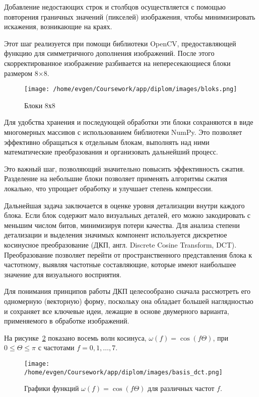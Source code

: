 Добавление недостающих строк и столбцов осуществляется с помощью повторения граничных значений (пикселей) изображения, 
чтобы минимизировать искажения, возникающие на краях. 

\AddedBlocks

Этот шаг реализуется при помощи библиотеки OpenCV, предоставляющей функцию для симметричного дополнения изображений. 
После этого скорректированное изображение разбивается на непересекающиеся блоки размером 8×8.

\begin{figure}[H]
    \centering
    \texttt{[image: /home/evgen/Coursework/app/diplom/images/bloks.png]}
    \caption{Блоки 8х8}
    \label{fig:blocks}
\end{figure}


Для удобства хранения и последующей обработки эти блоки сохраняются в виде многомерных массивов с использованием библиотеки NumPy. 
Это позволяет эффективно обращаться к отдельным блокам, выполнять над ними математические преобразования и организовать дальнейший процесс.


Это важный шаг, позволяющий значительно повысить эффективность сжатия. 
Разделение на небольшие блоки позволяет применять алгоритмы сжатия локально, что упрощает обработку и улучшает степень компрессии.

Дальнейшая задача заключается в оценке уровня детализации внутри каждого блока. 
Если блок содержит мало визуальных деталей, его можно закодировать с меньшим числом битов, минимизируя потери качества. 
Для анализа степени детализации и выделения значимых компонент используется дискретное косинусное преобразование (ДКП, англ. Discrete Cosine Transform, DCT). 
Преобразование позволяет перейти от пространственного представления блока к частотному, выявляя частотные составляющие, которые имеют наибольшее значение для визуального восприятия.

Для понимания принципов работы ДКП целесообразно сначала рассмотреть его одномерную (векторную) форму, 
поскольку она обладает большей наглядностью и сохраняет все ключевые идеи, лежащие в основе двумерного варианта, применяемого в обработке изображений.


На рисунке~\ref{fig:coswaves}  показано восемь волн косинуса, $\omega(f) = \cos{(f \Theta)}$, при $0 \leq \Theta \leq \pi$ с частотами $f=0,1,\ldots,7$.

\begin{figure}[h!]
    \centering
    \texttt{[image: /home/evgen/Coursework/app/diplom/images/basis\_dct.png]}
    \caption{Графики функций $\omega(f) = \cos{(f \Theta)}$ для различных частот $f$.}
    \label{fig:coswaves}
\end{figure}

